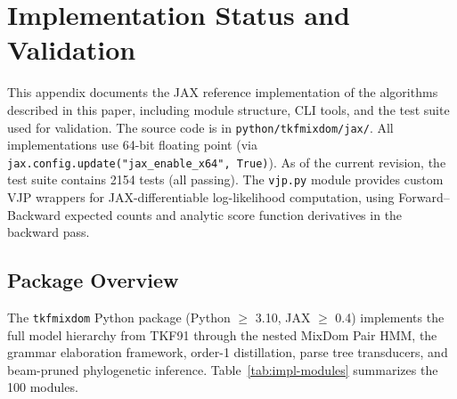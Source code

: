 
\section{Implementation Status and Validation}
\label{sec:appendix-implementations}

This appendix documents the JAX reference implementation of the algorithms
described in this paper, including module structure, CLI tools,
and the test suite used for validation.
The source code is in \texttt{python/tkfmixdom/jax/}.
All implementations use 64-bit floating point (via \texttt{jax.config.update("jax\_enable\_x64", True)}).
As of the current revision, the test suite contains 2154 tests (all passing).
The \texttt{vjp.py} module provides custom VJP wrappers for JAX-differentiable
log-likelihood computation, using Forward--Backward expected counts and analytic
score function derivatives in the backward pass.

\subsection{Package Overview}
\label{sec:impl-overview}

The \texttt{tkfmixdom} Python package (Python $\geq$ 3.10, JAX $\geq$ 0.4) implements
the full model hierarchy from TKF91 through the nested MixDom Pair HMM,
the grammar elaboration framework, order-1 distillation,
parse tree transducers, and beam-pruned phylogenetic inference.
Table~\ref{tab:impl-modules} summarizes the 100 modules.

